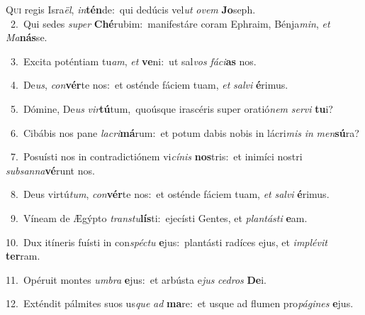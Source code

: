 \lettrine{\initial\textcolor{\initialcolor}{Q}}{ui} regis Isra\-\textit{ël}\-, \textit{in}\-\textbf{tén}de:~\star qui dedúcis vel\textit{ut} \textit{o}\-\textit{vem} \textbf{Jo}\-seph.\\
{\numbfont\textcolor{\numbcolor}{~2.}}~Qui sedes \textit{su}\-\textit{per} \textbf{Ché}\-rubim:~\star manifestáre coram Ephraim, Bénja\-\textit{min}\-, \textit{et} \textit{Ma}\-\textbf{nás}se.\par
{\numbfont\textcolor{\numbcolor}{~3.}}~Excita poténtiam tu\-\textit{am}\-, \textit{et} \textbf{ve}\-ni:~\star ut sal\textit{vos} \textit{fá}\-\textit{ci}\textbf{as} nos.\par
{\numbfont\textcolor{\numbcolor}{~4.}}~De\-\textit{us}\-, \textit{con}\-\textbf{vér}te nos:~\star et osténde fáciem tuam, \textit{et} \textit{sal}\-\textit{vi} \textbf{é}\-rimus.\par
{\numbfont\textcolor{\numbcolor}{~5.}}~Dómine, De\textit{us} \textit{vir}\-\textbf{tú}tum,~\star quoúsque irascéris super oratió\textit{nem} \textit{ser}\-\textit{vi} \textbf{tu}\-i?\par
{\numbfont\textcolor{\numbcolor}{~6.}}~Cibábis nos pane \textit{la}\-\textit{cri}\textbf{má}rum:~\star et potum dabis nobis in lácri\textit{mis} \textit{in} \textit{men}\-\textbf{sú}ra?\par
{\numbfont\textcolor{\numbcolor}{~7.}}~Posuísti nos in contradictiónem vi\-\textit{cí}\-\textit{nis} \textbf{nos}\-tris:~\star et inimíci nostri \textit{sub}\-\textit{san}\textit{na}\textbf{vé}runt nos.\par
{\numbfont\textcolor{\numbcolor}{~8.}}~Deus virtú\-\textit{tum}\-, \textit{con}\-\textbf{vér}te nos:~\star et osténde fáciem tuam, \textit{et} \textit{sal}\-\textit{vi} \textbf{é}\-rimus.\par
{\numbfont\textcolor{\numbcolor}{~9.}}~Víneam de Ægýpto \textit{trans}\-\textit{tu}\textbf{lís}ti:~\star ejecísti Gentes, et \textit{plan}\-\textit{tás}\textit{ti} \textbf{e}\-am.\par
{\numbfont\textcolor{\numbcolor}{10.}}~Dux itíneris fuísti in con\-\textit{spéc}\-\textit{tu} \textbf{e}\-jus:~\star plantásti radíces ejus, et \textit{im}\-\textit{plé}\textit{vit} \textbf{ter}\-ram.\par
{\numbfont\textcolor{\numbcolor}{11.}}~Opéruit montes \textit{um}\-\textit{bra} \textbf{e}\-jus:~\star et arbústa e\textit{jus} \textit{ce}\-\textit{dros} \textbf{De}\-i.\par
{\numbfont\textcolor{\numbcolor}{12.}}~Exténdit pálmites suos us\textit{que} \textit{ad} \textbf{ma}\-re:~\star et usque ad flumen pro\-\textit{pá}\-\textit{gi}\textit{nes} \textbf{e}\-jus.\par
